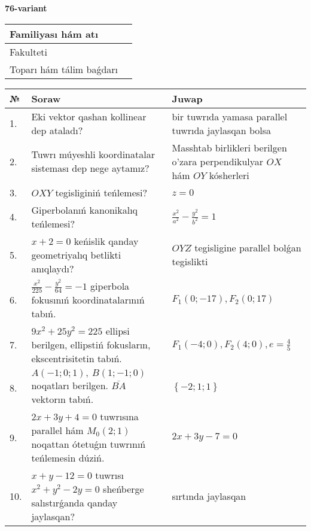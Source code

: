 \documentclass{article}
\begin{document}
\newpage


\textbf{76-variant}\\

\bgroup
\def\arraystretch{1.6} %

\begin{tabular}{|m{5.7cm}|m{9.5cm}|}
\hline
Familiyası hám atı & \\
\hline
Fakulteti  & \\
\hline
Toparı hám tálim baǵdarı  & \\
\hline
\end{tabular}

\vspace{1cm}

\begin{tabular}{|m{0.7cm}|m{10cm}|m{4cm}|}
\hline
№ & Soraw & Juwap \\
\hline
1. & Eki vektor qashan kollinear dep ataladı? & bir tuwrıda yamasa parallel tuwrıda jaylasqan bolsa \\
\hline
2. & Tuwrı múyeshli koordinatalar sisteması dep nege aytamız? & Masshtab birlikleri berilgen o'zara perpendikulyar $OX$ hám $OY$ kósherleri \\
\hline
3. & $OXY$ tegisliginiń teńlemesi? & $z=0$ \\
\hline
4. & Giperbolanıń kanonikalıq teńlemesi? & $\frac{x^2}{a^2}-\frac{y^2}{b^2}=1$ \\
\hline
5. & $x+2=0$ keńislik qanday geometriyalıq betlikti anıqlaydı? &  $OYZ$ tegisligine parallel bolǵan tegislikti \\
\hline
6. & $\frac{x^{2}}{225}-\frac{y^{2}}{64}=-1$ giperbola fokusınıń koordinatalarınıń tabıń. & $F_{1}(0;-17), F_{2}(0;17)$ \\
\hline
7. & $9x^{2}+25y^{2}=225$ ellipsi berilgen, ellipstiń fokusların, ekscentrisitetin tabıń. & $F_1\left(-4;0 \right) , F_2\left( 4;0 \right) , e = \frac{4}{5}$ \\
\hline
8. & $A (-1;0;1),\ B (1;-1;0)$ noqatları berilgen. $\overline{BA}$ vektorın tabıń. & $\left\{ - 2;1;1 \right\}$ \\
\hline
9. & $2x+3y+4=0$ tuwrısına parallel hám $M_{0} (2;1)$ noqattan ótetuǵın tuwrınıń teńlemesin dúziń. & $2x+3y-7=0$ \\
\hline
10. & $x+y-12=0$ tuwrısı $x^{2}+y^{2}-2y=0$ sheńberge salıstırǵanda qanday jaylasqan? & sırtında jaylasqan \\
\hline
\end{tabular}

\vspace{1cm}
\end{document}
